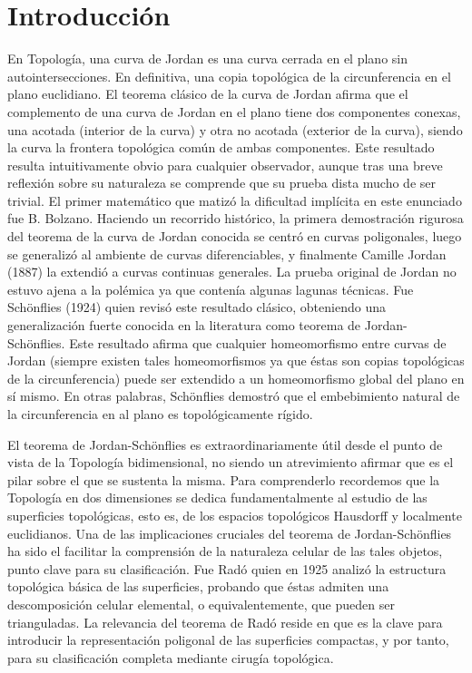 \chapter*{Introducción}
En Topología, una curva de Jordan es una curva cerrada en el plano sin autointersecciones. En definitiva, una copia topológica de la circunferencia en el plano euclidiano. El teorema clásico de la curva de Jordan  afirma que el complemento de una curva de Jordan en el plano tiene dos componentes conexas, una acotada (interior de la curva) y otra no acotada   (exterior de la curva), siendo la curva la frontera topológica común  de ambas componentes. Este resultado resulta intuitivamente obvio para cualquier observador, aunque tras una breve reflexión sobre su naturaleza se comprende  que su prueba dista mucho de ser trivial. El primer matemático que matizó la dificultad implícita en este enunciado fue B. Bolzano. Haciendo un recorrido histórico, la primera demostración rigurosa del teorema de la curva de Jordan conocida se centró en curvas poligonales, luego se generalizó al ambiente de curvas diferenciables, y finalmente   Camille Jordan (1887) la extendió a curvas continuas generales. La prueba original de Jordan no estuvo ajena a la polémica ya que contenía algunas lagunas técnicas. Fue Schönflies (1924) quien  revisó este resultado clásico,  obteniendo una generalización fuerte conocida en la literatura como teorema de Jordan-Schönflies. Este resultado afirma que cualquier homeomorfismo entre   curvas de Jordan (siempre existen tales homeomorfismos ya que   éstas son copias topológicas de la circunferencia) puede ser extendido a un homeomorfismo global del plano en sí mismo. En otras palabras, Schönflies demostró que el embebimiento natural de la circunferencia en al plano es topológicamente rígido. 

El teorema de Jordan-Schönflies es extraordinariamente útil desde el punto de vista de la Topología bidimensional, no siendo un atrevimiento  afirmar que es el pilar sobre el que se sustenta la misma. 
Para comprenderlo recordemos que la Topología en dos dimensiones se dedica fundamentalmente al estudio de las superficies topológicas, esto es, de los espacios topológicos  Hausdorff y localmente euclidianos.  Una de las implicaciones cruciales del teorema de Jordan-Schönflies  ha sido el facilitar la comprensión de la naturaleza celular de las tales objetos, punto clave para su clasificación. Fue Radó quien en 1925  analizó la estructura topológica básica de las superficies, probando que  éstas admiten una descomposición celular elemental, o equivalentemente, que pueden ser  trianguladas. La relevancia del teorema de Radó  reside en que  es la clave para introducir la representación poligonal de las superficies compactas, y por tanto, para  su clasificación completa mediante cirugía topológica.

